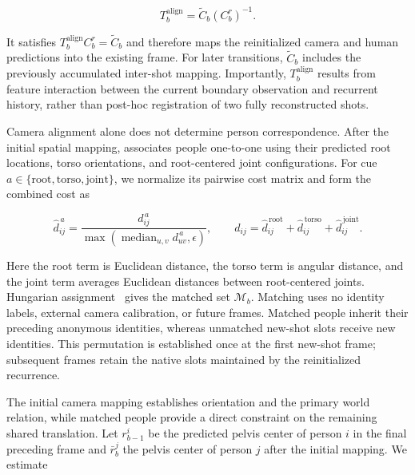\begin{equation}
 T_b^{\mathrm{align}}=\widetilde C_b(C_b^r)^{-1}.
 \label{eq:inter-shot-alignment}
\end{equation}

It satisfies $T_b^{\mathrm{align}}C_b^r=\widetilde C_b$ and therefore maps the
reinitialized camera and human predictions into the existing frame. For later
transitions, $\widetilde C_b$ includes the previously accumulated inter-shot
mapping. Importantly, $T_b^{\mathrm{align}}$ results from feature interaction
between the current boundary observation and recurrent history, rather than
post-hoc registration of two fully reconstructed shots.

Camera alignment alone does not determine person correspondence. After the
initial spatial mapping, \method{} associates people one-to-one using their
predicted root locations, torso orientations, and root-centered joint
configurations. For cue $a\in\{\mathrm{root},\mathrm{torso},\mathrm{joint}\}$,
we normalize its pairwise cost matrix and form the combined cost as

\begin{equation}
 \widehat d_{ij}^{\,a}=
 \frac{d_{ij}^{\,a}}
 {\max\!\left(\operatorname{median}_{u,v}d_{uv}^{\,a},\epsilon\right)},
 \qquad
 d_{ij}=\widehat d_{ij}^{\,\mathrm{root}}
       +\widehat d_{ij}^{\,\mathrm{torso}}
       +\widehat d_{ij}^{\,\mathrm{joint}}.
 \label{eq:association-cost}
\end{equation}

Here the root term is Euclidean distance, the torso term is angular distance,
and the joint term averages Euclidean distances between root-centered joints.
Hungarian assignment~\citep{munkres1957assignment} gives the matched set
$\mathcal M_b$. Matching uses no identity labels, external camera calibration,
or future frames. Matched people inherit their preceding anonymous identities,
whereas unmatched new-shot slots receive new identities. This permutation is
established once at the first new-shot frame; subsequent frames retain the
native slots maintained by the reinitialized recurrence.

The initial camera mapping establishes orientation and the primary world
relation, while matched people provide a direct constraint on the remaining
shared translation. Let $r_{b-1}^i$ be the predicted pelvis center of person
$i$ in the final preceding frame and $\bar r_b^j$ the pelvis center of person
$j$ after the initial mapping. We estimate

